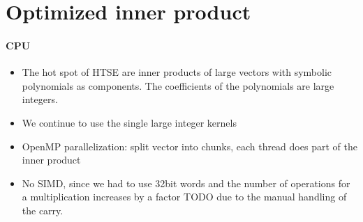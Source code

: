 \documentclass[oribibl]{llncs2e/llncs}
\begin{document}
\section{Optimized inner product}
\paragraph{CPU}
\begin{itemize}
\item The hot spot of HTSE are inner products of large vectors with symbolic polynomials as components. The coefficients of the polynomials are large integers.
\item We continue to use the single large integer kernels
\item OpenMP parallelization: split vector into chunks, each thread does part of the inner product
\item No SIMD, since we had to use 32bit words and the number of operations for a multiplication increases by a factor TODO due to the manual handling of the carry.
\end{itemize}
\end{document}
